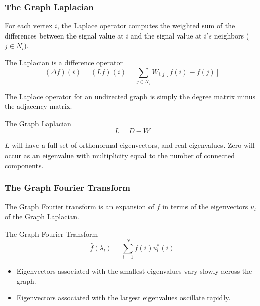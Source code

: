 \documentclass{beamer}
\begin{document}
\begin{frame}
\frametitle{The Graph Laplacian}

For each vertex $i$, the Laplace operator computes the weighted sum of the
differences between the signal value at $i$ and the signal value at $i's$
neighbors ($j \in N_i$). 

\begin{block}{The Laplacian is a difference operator}
  \begin{equation}
    (\Delta f) (i) = (L f) (i) = \sum_{j \in N_i} W_{i, j} [f(i) - f(j)]
  \end{equation}
\end{block}

The Laplace operator for an undirected graph is simply the degree matrix minus the
adjacency matrix.

\begin{block}{The Graph Laplacian}
  \begin{equation}
    L = D - W
  \end{equation}
\end{block}

$L$ will have a full set of orthonormal eigenvectors, and real eigenvalues. Zero
will occur as an eigenvalue with multiplicity equal to the number of connected
components.
\end{frame}

\begin{frame}
  \frametitle{The Graph Fourier Transform}
  The Graph Fourier transform is an expansion of $f$ in terms of the
  eigenvectors $u_l$ of the Graph Laplacian.
  
  \begin{block}{The Graph Fourier Transform}
    \begin{equation}
      \hat{f}(\lambda_l) = \sum_{i=1}^N f(i) u^*_l(i) 
    \end{equation}
  \end{block}

  \begin{itemize}
    \item Eigenvectors associated with the smallest eigenvalues vary slowly across
      the graph.
    \item Eigenvectors associated with the largest eigenvalues oscillate rapidly.
  \end{itemize}
\end{frame}
\end{document}
